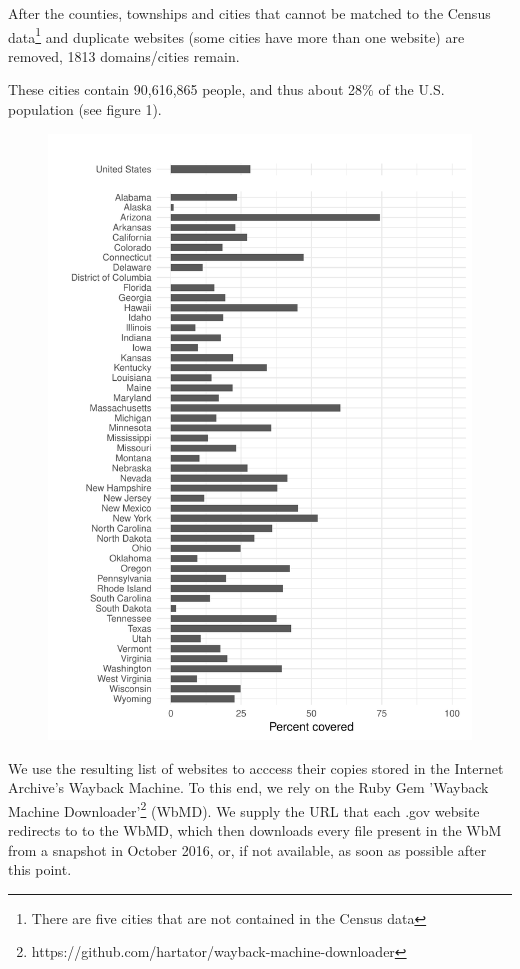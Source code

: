 \documentclass[11pt]{article}
\begin{document}
After the counties, townships and cities that cannot be matched to the Census data\footnote{There are five cities that are not contained in the Census data} and duplicate websites (some cities have more than one website) are removed, 1813 domains/cities remain.

These cities contain 90,616,865 people, and thus about 28\% of the U.S. population (see figure 1).

\begin{figure}[!ht]
	\centering
	\includegraphics[width=0.9\linewidth,height=0.9\textheight]{figures/coverage_states.pdf}
\end{figure}

We use the resulting list of websites to acccess their copies stored in the Internet Archive's Wayback Machine. To this end, we rely on the Ruby Gem 'Wayback Machine Downloader'\footnote{https://github.com/hartator/wayback-machine-downloader} (WbMD). We supply the URL that each .gov website redirects to to the WbMD, which then downloads every file present in the WbM from a snapshot in October 2016, or, if not available, as soon as possible after this point.
\end{document}
